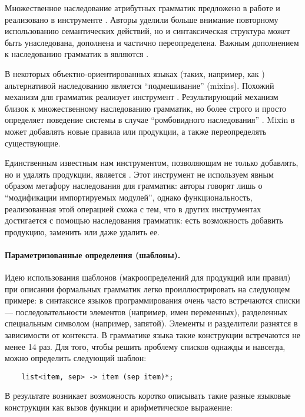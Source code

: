 Множественное наследование атрибутных грамматик предложено в работе \cite{???} и реализовано в инструменте . %
Авторы уделили больше внимание повторному использованию семантических действий, но и синтаксическая структура может быть унаследована, дополнена и частично переопределена.
Важным дополнением к наследованию грамматик в  являются .

В некоторых объектно-ориентированных языках (таких, например, как  \cite{???}) альтернативой наследованию является ``подмешивание'' (mixins). Похожий механизм для грамматик реализует инструмент  \cite{???}. Результирующий механизм близок к множественному наследованию грамматик, но более строго и просто определяет поведение системы в случае ``ромбовидного наследования'' \cite{???}. Mixin в  может добавлять новые правила или продукции, а также переопределять существующие.

Единственным известным нам инструментом, позволяющим не только добавлять, но и удалять продукции, является  \cite{???}. Этот инструмент не используем явным образом метафору наследования для грамматик: авторы говорят лишь о ``модификации импортируемых модулей'', однако функциональность, реализованная этой операцией схожа с тем, что в других инструментах достигается с помощью наследования грамматик: есть возможность добавить продукцию, заменить или даже удалить ее.


\paragraph*{Параметризованные определения (шаблоны).}
Идею использования шаблонов (макроопределений для продукций или правил) при описании формальных грамматик легко проиллюстрировать на следующем примере: в синтаксисе языков программирования очень часто встречаются списки --- последовательности элементов (например, имен переменных), разделенных специальным символом (например, запятой). Элементы и разделители разнятся в зависимости от контекста. В грамматике языка  \cite{???} такие конструкции встречаются не менее 14 раз. Для того, чтобы решить проблему списков однажды и навсегда, можно определить следующий шаблон:

\begin{lstlisting}
	list<item, sep> -> item (sep item)*;
\end{lstlisting}

В результате возникает возможность коротко описывать такие разные языковые конструкции как вызов функции и арифметическое выражение:

